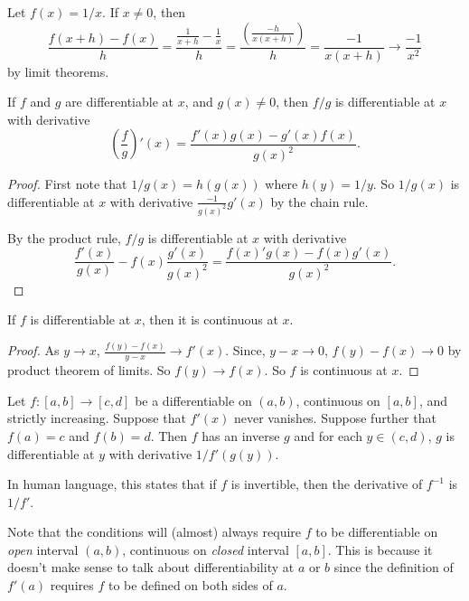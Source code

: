 \documentclass[a4paper]{article}
\begin{document}
\begin{eg}
  Let $f(x) = 1/x$. If $x\not = 0$, then
  \[
    \frac{f(x + h) - f(x)}{h} = \frac{\frac{1}{x + h} - \frac{1}{x}}{h} = \frac{\left(\frac{-h}{x(x + h)}\right)}{h} = \frac{-1}{x(x + h)} \to \frac{-1}{x^2}
  \]
  by limit theorems.
\end{eg}

\begin{lemma}
  If $f$ and $g$ are differentiable at $x$, and $g(x) \not = 0$, then $f/g$ is differentiable at $x$ with derivative
  \[
    \left(\frac{f}{g}\right)'(x) = \frac{f'(x)g(x) - g'(x)f(x)}{g(x)^2}.
  \]
\end{lemma}

\begin{proof}
  First note that $1/g(x) = h(g(x))$ where $h(y) = 1/y$. So $1/g(x)$ is differentiable at $x$ with derivative $\displaystyle \frac{-1}{g(x)^2}g'(x)$ by the chain rule.

  By the product rule, $f/g$ is differentiable at $x$ with derivative
  \[
    \frac{f'(x)}{g(x)} - f(x)\frac{g'(x)}{g(x)^2} = \frac{f(x)'g(x) - f(x)g'(x)}{g(x)^2}.
  \]
\end{proof}
\begin{lemma}
  If $f$ is differentiable at $x$, then it is continuous at $x$.
\end{lemma}

\begin{proof}
  As $y\to x$, $\displaystyle \frac{f(y) - f(x)}{y - x} \to f'(x)$. Since, $y - x \to 0$, $f(y) - f(x) \to 0$ by product theorem of limits. So $f(y) \to f(x)$. So $f$ is continuous at $x$.
\end{proof}

\begin{thm}
  Let $f:[a, b]\to [c, d]$ be a differentiable on $(a, b)$, continuous on $[a, b]$, and strictly increasing. Suppose that $f'(x)$ never vanishes. Suppose further that $f(a) = c$ and $f(b) = d$. Then $f$ has an inverse $g$ and for each $y\in (c, d)$, $g$ is differentiable at $y$ with derivative $1/f'(g(y))$.

  In human language, this states that if $f$ is invertible, then the derivative of $f^{-1}$ is $1/f'$.
\end{thm}
Note that the conditions will (almost) always require $f$ to be differentiable on \emph{open} interval $(a, b)$, continuous on \emph{closed} interval $[a, b]$. This is because it doesn't make sense to talk about differentiability at $a$ or $b$ since the definition of $f'(a)$ requires $f$ to be defined on both sides of $a$.
\end{document}
